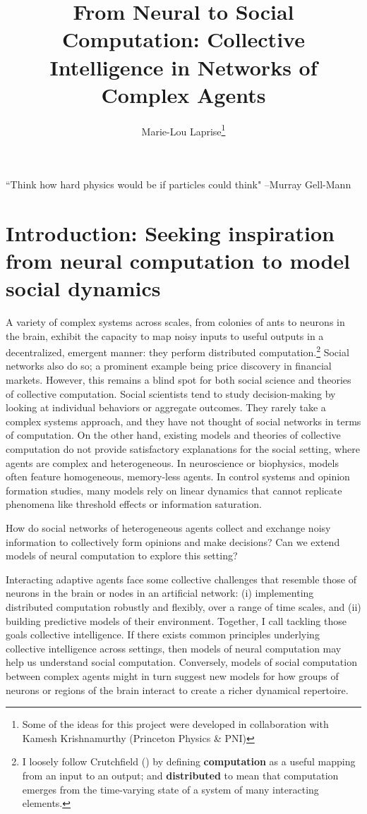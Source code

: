 \documentclass[]{article}
\title{From Neural to Social Computation: Collective Intelligence in Networks of Complex Agents}
\author{Marie-Lou Laprise\footnote{Some of the ideas for this project were developed in collaboration with Kamesh Krishnamurthy (Princeton Physics \& PNI)}}
\begin{document}
	
	\maketitle
	
``Think how hard physics would be if particles could think" --Murray Gell-Mann

\section{Introduction: Seeking inspiration from neural computation to model social dynamics}
A variety of complex systems across scales, from colonies of ants to neurons in the brain, exhibit the capacity to map noisy inputs to useful outputs in a decentralized, emergent manner: they perform distributed computation.\footnote{ I loosely follow Crutchfield (\cite{crutchfieldCalculiEmergenceComputation1994}) by defining \textbf{computation} as a useful mapping from an input to an output; and \textbf{distributed} to mean that computation emerges from the time-varying state of a system of many interacting elements.} Social networks also do so; a prominent example being price discovery in financial markets. However, this remains a blind spot for both social science and theories of collective computation. Social scientists tend to study decision-making by looking at individual behaviors or aggregate outcomes. They rarely take a complex systems approach, and they have not thought of social networks in terms of computation. On the other hand, existing models and theories of collective computation do not provide satisfactory explanations for the social setting, where agents are complex and heterogeneous. In neuroscience or biophysics, models often feature homogeneous, memory-less agents. In control systems and opinion formation studies, many models rely on linear dynamics that cannot replicate phenomena like threshold effects or information saturation.

How do social networks of heterogeneous agents collect and exchange noisy information to collectively form opinions and make decisions? Can we extend models of neural computation to explore this setting?

Interacting adaptive agents face some collective challenges that resemble those of neurons in the brain or nodes in an artificial network: (i) implementing distributed computation robustly and flexibly, over a range of time scales, and (ii) building predictive models of their environment. Together, I call tackling those goals collective intelligence. If there exists common principles underlying collective intelligence across settings, then models of neural computation may help us understand social computation. Conversely, models of social computation between complex agents might in turn suggest new models for how groups of neurons or regions of the brain interact to create a richer dynamical repertoire.
\end{document}
